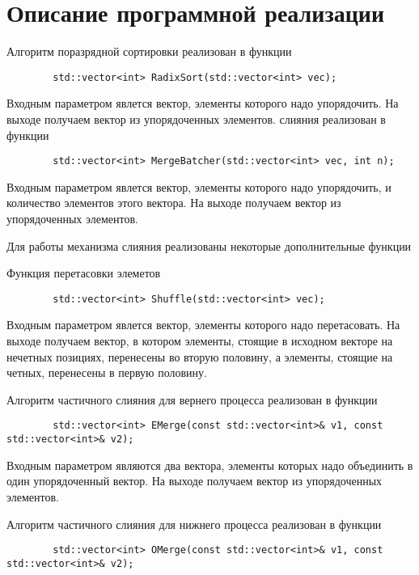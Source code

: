 \documentclass{report}
\begin{document}
	\section*{Описание программной реализации}
	Алгоритм поразрядной сортировки реализован в функции
	\begin{lstlisting}
		std::vector<int> RadixSort(std::vector<int> vec);
	\end{lstlisting}
	\par Входным параметром явлется вектор, элементы которого надо упорядочить. На выходе получаем вектор из упорядоченных элементов.
	 слияния реализован в функции
	\begin{lstlisting}
		std::vector<int> MergeBatcher(std::vector<int> vec, int n);
	\end{lstlisting}
	\par Входным параметром явлется вектор, элементы которого надо упорядочить, и количество элементов этого вектора. На выходе получаем вектор из упорядоченных элементов.
	\par Для работы механизма слияния реализованы некоторые дополнительные функции
	\par Функция перетасовки элеметов
	\begin{lstlisting}
		std::vector<int> Shuffle(std::vector<int> vec);
	\end{lstlisting}
	\par Входным параметром явлется вектор, элементы которого надо перетасовать. На выходе получаем вектор, в котором элементы, стоящие в исходном векторе на нечетных позициях, перенесены во вторую половину, а элементы, стоящие на четных, перенесены в первую половину.
	\par Алгоритм частичного слияния для вернего процесса реализован в функции
	\begin{lstlisting}
		std::vector<int> EMerge(const std::vector<int>& v1, const std::vector<int>& v2);
	\end{lstlisting}
	\par Входным параметром являются два вектора, элементы которых надо объединить в один упорядоченный вектор. На выходе получаем вектор из упорядоченных элементов.
	\par Алгоритм частичного слияния для нижнего процесса реализован в функции
	\begin{lstlisting}
		std::vector<int> OMerge(const std::vector<int>& v1, const std::vector<int>& v2);
	\end{lstlisting}
\end{document}
